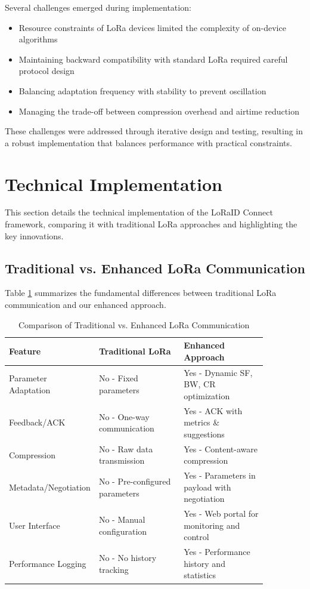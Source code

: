 \documentclass[conference]{IEEEtran}
\begin{document}
Several challenges emerged during implementation:
\begin{itemize}
    \item Resource constraints of LoRa devices limited the complexity of on-device algorithms
    \item Maintaining backward compatibility with standard LoRa required careful protocol design
    \item Balancing adaptation frequency with stability to prevent oscillation
    \item Managing the trade-off between compression overhead and airtime reduction
\end{itemize}

These challenges were addressed through iterative design and testing, resulting in a robust implementation that balances performance with practical constraints.

\section{Technical Implementation}
This section details the technical implementation of the LoRaID Connect framework, comparing it with traditional LoRa approaches and highlighting the key innovations.

\subsection{Traditional vs. Enhanced LoRa Communication}
Table \ref{tab:comparison} summarizes the fundamental differences between traditional LoRa communication and our enhanced approach.

\begin{table}[htbp]
\caption{Comparison of Traditional vs. Enhanced LoRa Communication}
\label{tab:comparison}
\begin{center}
\begin{tabular}{|p{0.18\linewidth}|p{0.34\linewidth}|p{0.34\linewidth}|}
\hline
\textbf{Feature} & \textbf{Traditional LoRa} & \textbf{Enhanced Approach} \\
\hline
Parameter Adaptation & No - Fixed parameters & Yes - Dynamic SF, BW, CR optimization \\
\hline
Feedback/ACK & No - One-way communication & Yes - ACK with metrics \& suggestions \\
\hline
Compression & No - Raw data transmission & Yes - Content-aware compression \\
\hline
Metadata/Negotiation & No - Pre-configured parameters & Yes - Parameters in payload with negotiation \\
\hline
User Interface & No - Manual configuration & Yes - Web portal for monitoring and control \\
\hline
Performance Logging & No - No history tracking & Yes - Performance history and statistics \\
\hline
\end{tabular}
\end{center}
\end{table}
\end{document}
